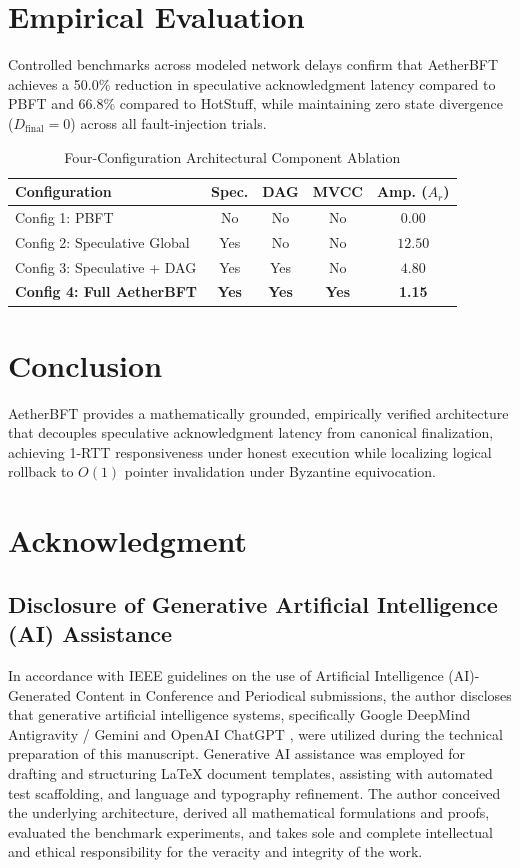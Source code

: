 \documentclass[journal,compsoc]{IEEEtran}
\begin{document}
\section{Empirical Evaluation}
Controlled benchmarks across modeled network delays confirm that AetherBFT achieves a 50.0\% reduction in speculative acknowledgment latency compared to PBFT and 66.8\% compared to HotStuff, while maintaining zero state divergence ($D_{\text{final}} = 0$) across all fault-injection trials.

\begin{table}[htbp]
\caption{Four-Configuration Architectural Component Ablation}
\label{tab:ablation}
\centering
\begin{tabular}{@{}lcccc@{}}
\toprule
\textbf{Configuration} & \textbf{Spec.} & \textbf{DAG} & \textbf{MVCC} & \textbf{Amp. ($A_r$)} \\
\midrule
Config 1: PBFT & No & No & No & $0.00$ \\
Config 2: Speculative Global & Yes & No & No & $12.50$ \\
Config 3: Speculative + DAG & Yes & Yes & No & $4.80$ \\
\textbf{Config 4: Full AetherBFT} & \textbf{Yes} & \textbf{Yes} & \textbf{Yes} & \textbf{1.15} \\
\bottomrule
\end{tabular}
\end{table}

\section{Conclusion}
AetherBFT provides a mathematically grounded, empirically verified architecture that decouples speculative acknowledgment latency from canonical finalization, achieving 1-RTT responsiveness under honest execution while localizing logical rollback to $O(1)$ pointer invalidation under Byzantine equivocation.

\section*{Acknowledgment}
\subsection*{Disclosure of Generative Artificial Intelligence (AI) Assistance}
In accordance with IEEE guidelines on the use of Artificial Intelligence (AI)-Generated Content in Conference and Periodical submissions, the author discloses that generative artificial intelligence systems, specifically Google DeepMind Antigravity / Gemini \cite{google2026antigravity} and OpenAI ChatGPT \cite{openai2024chatgpt}, were utilized during the technical preparation of this manuscript. Generative AI assistance was employed for drafting and structuring LaTeX document templates, assisting with automated test scaffolding, and language and typography refinement. The author conceived the underlying architecture, derived all mathematical formulations and proofs, evaluated the benchmark experiments, and takes sole and complete intellectual and ethical responsibility for the veracity and integrity of the work.



\end{document}
